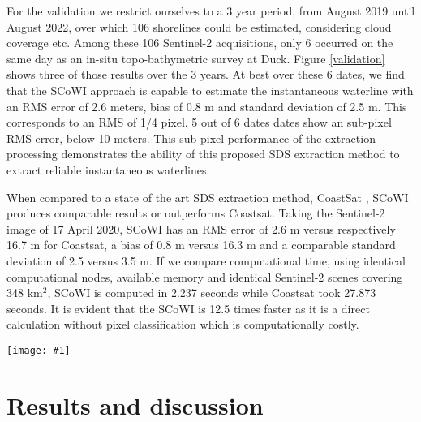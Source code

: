 \documentclass[remotesensing,article,submit,pdftex,moreauthors]{Definitions/mdpi}
\newcommand{\myfigure}[4]{
    \begin{figure*}[h!]
        \centering
        \texttt{[image: \#1]}	 
        \caption{\itshape#2}
        \label{#3}
    \end{figure*} 
}
\begin{document}
For the validation we restrict ourselves to a 3 year period, from August 2019 until August 2022, over which 106 shorelines could be estimated, considering cloud coverage etc. Among these 106 Sentinel-2 acquisitions, only 6 occurred on the same day as an in-situ topo-bathymetric survey at Duck. Figure \ref{validation} shows three of those results over the 3 years. At best over these 6 dates, we find that the SCoWI approach is capable to estimate the instantaneous waterline with an RMS error of 2.6 meters, bias of 0.8 m and standard deviation of 2.5 m. This corresponds to an RMS of 1/4 pixel. 5 out of 6 dates dates show an sub-pixel RMS error, below 10 meters. This sub-pixel performance of the extraction processing demonstrates the ability of this proposed SDS extraction method to extract reliable instantaneous waterlines.

When compared to a state of the art SDS extraction method, CoastSat \citep{VOS2019_sub}, SCoWI produces comparable results or outperforms Coastsat. Taking the Sentinel-2 image of 17 April 2020, SCoWI has an RMS error of 2.6 m versus respectively 16.7 m for Coastsat, a bias of 0.8 m versus 16.3 m and a comparable standard deviation of 2.5 versus 3.5 m. If we compare computational time, using identical computational nodes, available memory and identical Sentinel-2 scenes covering 348 km$^2$, SCoWI is computed in 2.237 seconds while Coastsat took 27.873 seconds. It is evident that the SCoWI is 12.5 times faster as it is a direct calculation without pixel classification which is computationally costly.

\myfigure{img/Results.png}{Comparison of waterline extracted using the new SCoWI-based extraction method (shoreliner) proposed in this paper (green line) with the in-situ measured waterline (red line). The right-hand side histograms display the positional error between the extracted and measured waterline. The smallest the cross-shore RMS error achieved a value of 2.6 meters corresponding to 1/4 of the Sentinel-2 pixel.}{validation}{1}




\section{Results and discussion}
\end{document}
